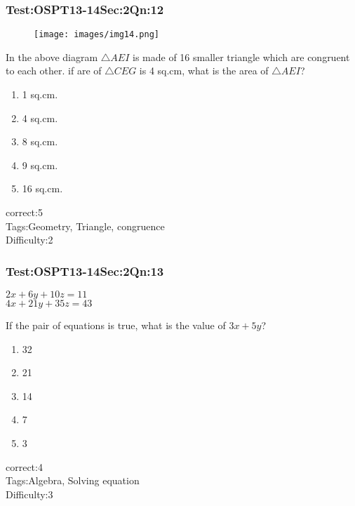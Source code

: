 \documentclass[]{beamer}
\begin{document}
    \begin{frame}
	    \frametitle{Test:OSPT13-14\hspace{2mm}Sec:2\hspace{2mm}Qn:12}
	    \begin{figure}
	    \begin{center}
	    \texttt{[image: images/img14.png]}
	    \end{center}
	    \end{figure}
	    In the above diagram $\bigtriangleup AEI$ is made of 16 smaller triangle which are congruent to each other. if are of $\bigtriangleup CEG$ is 4 sq.cm, what is the area of $\bigtriangleup AEI$?
	   \begin{enumerate}
	        \item
	           1 sq.cm.
	        \item
	            4 sq.cm.
	        \item
	           8 sq.cm.
	        \item
	            9 sq.cm.
	        \item
	           16 sq.cm.
	    \end{enumerate}
	    correct:5\\   
	    Tags:Geometry, Triangle, congruence \\
	    Difficulty:2   \\
    \end{frame}    
    \begin{frame}
	    \frametitle{Test:OSPT13-14\hspace{2mm}Sec:2\hspace{2mm}Qn:13}
	    \begin{center}
	    $2x+6y+10z=11$\\
	    $4x+21y+35z=43$
	    \end{center}
	    If the pair of equations is true, what is the value of $3x+5y$?
	   \begin{enumerate}
	        \item
	           32
	        \item
	            21
	        \item
	           14
	        \item
	            7
	        \item
	           3
	    \end{enumerate}
	    correct:4\\   
	    Tags:Algebra, Solving equation \\
	    Difficulty:3   \\
    \end{frame}    
\end{document}
